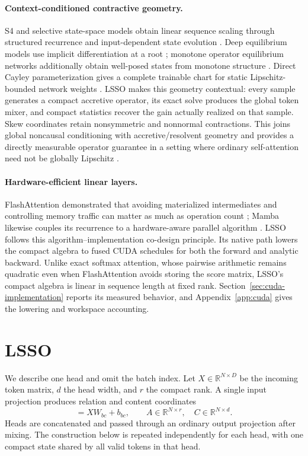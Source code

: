 \documentclass[10pt]{article}
\newcommand{\R}{\mathbb{R}}
\begin{document}
\paragraph{Context-conditioned contractive geometry.}
S4 and selective state-space models obtain linear sequence scaling through
structured recurrence and input-dependent state evolution
\cite{gu2022s4,gu2024mamba,dao2024mamba2}.  Deep equilibrium models use
implicit differentiation at a root \cite{bai2019deep}; monotone operator
equilibrium networks additionally obtain well-posed states from monotone
structure \cite{winston2020mondeq}.  Direct Cayley parameterization gives a
complete trainable chart for static Lipschitz-bounded network weights
\cite{wang2023direct}.  LSSO makes this geometry contextual: every sample
generates a compact accretive operator, its exact solve produces the global
token mixer, and compact statistics recover the gain actually realized on
that sample.  Skew coordinates retain nonsymmetric and nonnormal
contractions.  This joins global noncausal conditioning with
accretive/resolvent geometry \cite{bauschke2017convex} and provides a directly
measurable operator guarantee in a setting where ordinary self-attention need
not be globally Lipschitz \cite{kim2021lipschitz}.

\paragraph{Hardware-efficient linear layers.}
FlashAttention demonstrated that avoiding materialized intermediates and
controlling memory traffic can matter as much as operation count
\cite{dao2022flashattention}; Mamba likewise couples its recurrence to a
hardware-aware parallel algorithm \cite{gu2024mamba}.  LSSO follows this
algorithm--implementation co-design principle.  Its native path lowers the
compact algebra to fused CUDA schedules for both the forward and analytic
backward.  Unlike exact softmax attention, whose pairwise arithmetic remains
quadratic even when FlashAttention avoids storing the score matrix, LSSO's
compact algebra is linear in sequence length at fixed rank.
Section~\ref{sec:cuda-implementation} reports its measured behavior, and
Appendix~\ref{app:cuda} gives the lowering and workspace accounting.

\section{LSSO}
\label{sec:method}

We describe one head and omit the batch index.  Let $X\in\R^{N\times D}$ be
the incoming token matrix, $d$ the head width, and $r$ the compact rank.  A
single input projection produces relation and content coordinates
\begin{equation}
    [A,C] = XW_{bc}+b_{bc},
    \qquad A\in\R^{N\times r},\quad C\in\R^{N\times d}.
\label{eq:input-projection}
\end{equation}
Heads are concatenated and passed through an ordinary output projection after
mixing.  The construction below is repeated independently for each head, with
one compact state shared by all valid tokens in that head.
\end{document}
